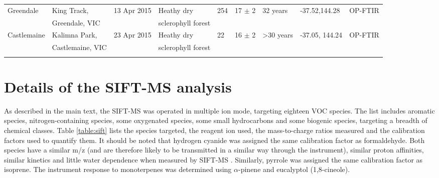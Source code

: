 \documentclass[acp, manuscript]{copernicus}
\begin{document}
\begin{sidewaystable}
\begin{tabular}{l l l l  l l l l l }
 Greendale&King Track, &13 Apr 2015&Heathy dry &254&17 $\pm$ 2&32 years&-37.52,144.28&OP-FTIR\\ 
 &Greendale, VIC&&sclerophyll forest&&&&&\\
 Castlemaine&Kalimna Park, &23 Apr 2015&Heathy dry&22&16 $\pm$ 2&>30 years&-37.05, 144.24&OP-FTIR\\
 &Castlemaine, VIC&&sclerophyll forest&&&&&\\
    \bottomhline
  \end{tabular}
  \label{table:fires}
\end{sidewaystable}

\section{Details of the SIFT-MS analysis}
As described in the main text, the SIFT-MS was operated in multiple ion mode, targeting eighteen VOC species. The list includes aromatic species, nitrogen-containing species, some oxygenated species, some small hydrocarbons and some biogenic species, targeting a breadth of chemical classes. Table \ref{table:sift} lists the species targeted, the reagent ion used, the mass-to-charge ratios measured and the calibration factors used to quantify them. 
It should be noted that hydrogen cyanide was assigned the same calibration factor as formaldehyde. Both species have a similar m/z (and are therefore likely to be transmitted in a similar way through the instrument), similar proton affinities, similar kinetics and little water dependence when measured by SIFT-MS \citep{Spanel1999,Spanel2004}. Similarly, pyrrole was assigned the same calibration factor as isoprene. The instrument response to monoterpenes was determined using $\alpha$-pinene and eucalyptol (1,8-cineole). 
\end{document}
